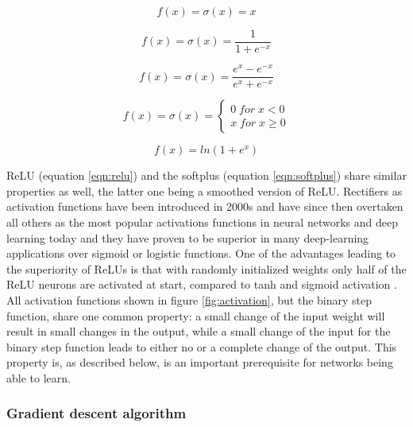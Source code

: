 \begin{equation}
 f(x) = \sigma(x) = x
 \label{eqn:ident}
\end{equation}
       
\begin{equation}
 f(x) = \sigma(x) = \frac{1}{1+e^{-x}} 
 \label{eqn:sigmoid}
\end{equation}

\begin{equation}
 f(x) = \sigma(x) = \frac{e^x - e^{-x}}{e^x + e^{-x}}
 \label{eqn:tanh}
\end{equation}

\begin{equation}
  f(x)= \sigma(x) = \left\{
 \begin{array}{ll}
  0 \; for \; x < 0 \\ 
  x \; for \; x \geq 0
 \end{array}
\right .
\label{eqn:relu}
\end{equation}

\begin{equation}
  f(x) = ln(1+e^x)
 \label{eqn:softplus}
\end{equation}

ReLU (equation \ref{eqn:relu}) and the softplus (equation \ref{eqn:softplus}) share similar properties as
well, the latter one being a smoothed version of ReLU. Rectifiers as activation functions have been introduced
in 2000s \cite{hahnloser2000digital} and have since then overtaken all others as the most popular activations
functions in neural networks and deep learning today \cite{lecun2015deep} and they have proven to be superior
in many deep-learning applications over sigmoid or logistic functions. One of the advantages leading to the
superiority of ReLUs is that with randomly initialized weights only half of the ReLU neurons are activated at start,
compared to tanh and sigmoid activation \cite{glorot2011deep}. All activation functions shown in figure
\ref{fig:activation}, but the binary step function, share one common property: a small change of the input
weight will result in small changes in the output, while a small change of the input for the binary step
function leads to either no or a complete change of the output. This property is, as described below, is an
important prerequisite for networks being able to learn. \\

\subsubsection{Gradient descent algorithm}

